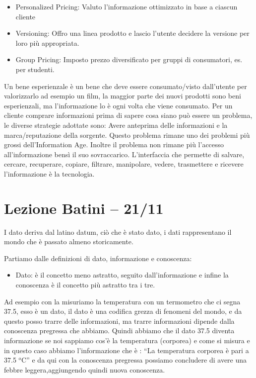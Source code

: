 \documentclass[a4page, 11pt]{article}
\begin{document}
\begin{itemize}
	 
	\item
	Personalized Pricing: Valuto l'informazione ottimizzato in base a
	ciascun cliente
	\item
	Versioning: Offro una linea prodotto e lascio l'utente decidere la
	versione per loro più appropriata.
	\item
	Group Pricing: Imposto prezzo diversificato per gruppi di consumatori,
	es. per studenti.
\end{itemize}

Un bene esperienzale è un bene che deve essere consumato/visto
dall'utente per valorizzarlo ad esempio un film, la maggior parte dei
nuovi prodotti sono beni esperienzali, ma l'informazione lo è ogni volta
che viene consumato. Per un cliente comprare informazioni prima di
sapere cosa siano può essere un problema, le diverse strategie adottate
sono: Avere anteprima delle informazioni e la marca/reputazione della
sorgente. Questo problema rimane uno dei problemi più grossi
dell'Information Age. Inoltre il problema non rimane più l'accesso
all'informazione bensì il suo sovraccarico. L'interfaccia che permette
di salvare, cercare, recuperare, copiare, filtrare, manipolare, vedere,
trasmettere e ricevere l'informazione è la tecnologia.

\section*{Lezione Batini -- 21/11}

I dato deriva dal latino datum, ciò che è stato dato, i dati
rappresentano il mondo che è passato almeno storicamente.

Partiamo dalle definizioni di dato, informazione e conoscenza:

\begin{itemize}
	 
	\item
	Dato: è il concetto meno astratto, seguito dall'informazione e infine
	la conoscenza è il concetto più astratto tra i tre. 
\end{itemize}

Ad esempio con la misuriamo la temperatura con un termometro che ci
segna 37.5, esso è un dato, il dato è una codifica grezza di fenomeni del mondo, e
da questo posso trarre delle informazioni, ma trarre informazioni
dipende dalla conoscenza pregressa che abbiamo. Quindi abbiamo che il dato 37.5
diventa informazione se noi sappiamo cos'è la temperatura (corporea) e
come si misura e in questo caso abbiamo l'informazione che è : ``La
temperatura corporea è pari a 37.5 $^o$C'' e da qui con la conoscenza
pregressa possiamo concludere di avere una febbre leggera,aggiungendo quindi 
nuova conoscenza.
\end{document}
